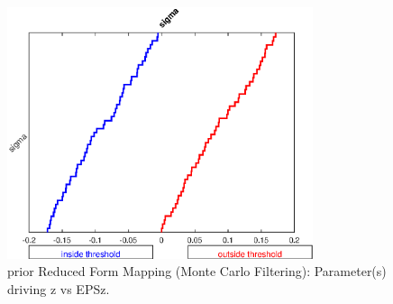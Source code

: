 
\begin{figure}[H]
\centering 
\includegraphics[width=0.8\textwidth]{RBC_kz/gsa/redform_prior/z_vs_EPSz_threshold/RBC_kz_prior_z_vs_EPSz_threshold}
\caption{prior Reduced Form Mapping (Monte Carlo Filtering): Parameter(s) driving z vs EPSz.}\label{Fig:RBC_kz_prior_z_vs_EPSz_threshold}
\end{figure}

